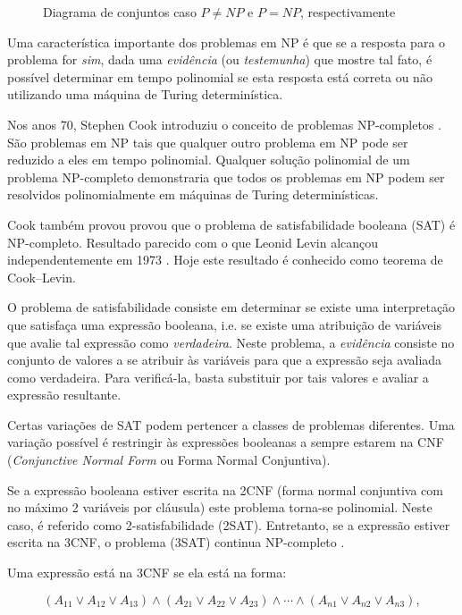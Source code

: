 \documentclass[a4paper,12pt,oneside,onecolumn]{uerj}
\begin{document}
\begin{figure}[ht]
\begin{subfigure}{.5\textwidth}
\end{subfigure}
\caption{Diagrama de conjuntos caso $P \neq NP$ e $P=NP$, respectivamente}
\label{fig:p_np}
\end{figure}


Uma característica importante dos problemas em NP é que se a resposta para o problema for \emph{sim}, dada uma \emph{evidência} (ou \emph{testemunha}) que mostre tal fato, é possível determinar em tempo polinomial se esta resposta está correta ou não utilizando uma máquina de Turing determinística.

Nos anos 70, Stephen Cook introduziu o conceito de problemas NP-completos \cite{bib:Cook71}. São problemas em NP tais que qualquer outro problema em NP pode ser reduzido a eles em tempo polinomial. Qualquer solução polinomial de um problema NP-completo demonstraria que todos os problemas em NP podem ser resolvidos polinomialmente em máquinas de Turing determinísticas.

Cook também provou provou que o problema de satisfabilidade booleana (SAT) é NP-completo. Resultado parecido com o que Leonid Levin alcançou independentemente em 1973 \cite{bib:Levin73}. Hoje este resultado é conhecido como teorema de Cook--Levin. 

O problema de satisfabilidade consiste em determinar se existe uma interpretação que satisfaça uma expressão booleana, i.e. se existe uma atribuição de variáveis que avalie tal expressão como \emph{verdadeira}. Neste problema, a \emph{evidência} consiste no conjunto de valores a se atribuir às variáveis para que a expressão seja avaliada como verdadeira. Para verificá-la, basta substituir por tais valores e avaliar a expressão resultante.

Certas variações de SAT podem pertencer a classes de problemas diferentes. Uma variação possível é restringir às expressões booleanas a sempre estarem na CNF (\emph{Conjunctive Normal Form} ou Forma Normal Conjuntiva). 

Se a expressão booleana estiver escrita na 2CNF (forma normal conjuntiva com no máximo 2 variáveis por cláusula) este problema torna-se polinomial. Neste caso, é referido como 2-satisfabilidade (2SAT). Entretanto, se a expressão estiver escrita na 3CNF, o problema (3SAT) continua NP-completo \cite{bib:Karp72}.

Uma expressão está na 3CNF se ela está na forma:

\begin{equation*}
(A_{11} \lor A_{12} \lor A_{13}) \wedge (A_{21} \lor A_{22} \lor A_{23}) \wedge \cdots \wedge (A_{n1} \lor A_{n2} \lor A_{n3}),
\end{equation*}
\end{document}
